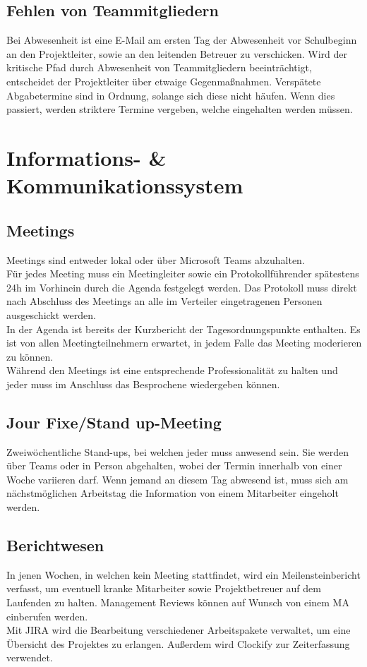 \documentclass[
	headings=optiontotocandhead,%
	oneside,
	numbers=noenddot,%
	toc=flat, %
	10pt, %
	parskip=full, %
	listof=totoc, %
	listof=flat, %
	numbers=noenddot, %
	bibliography=totoc, %
	a4paper,DIV=14,
]{scrartcl}
\begin{document}
\subsection{Fehlen von Teammitgliedern}
Bei Abwesenheit ist eine E-Mail am ersten Tag der Abwesenheit vor Schulbeginn an den Projektleiter, sowie an den leitenden Betreuer zu verschicken. Wird der kritische Pfad durch Abwesenheit von Teammitgliedern beeinträchtigt, entscheidet der Projektleiter über etwaige Gegenmaßnahmen. Verspätete Abgabetermine sind in Ordnung, solange sich diese nicht häufen. Wenn dies passiert, werden striktere Termine vergeben, welche eingehalten werden müssen.

\section{Informations- \& Kommunikationssystem}
\subsection{Meetings}
Meetings sind entweder lokal oder über Microsoft Teams abzuhalten.\\
Für jedes Meeting muss ein Meetingleiter sowie ein Protokollführender spätestens 24h im Vorhinein durch die Agenda festgelegt werden. Das Protokoll muss direkt nach Abschluss des Meetings an alle im Verteiler eingetragenen Personen ausgeschickt werden.\\
In der Agenda ist bereits der Kurzbericht der Tagesordnungspunkte enthalten. Es ist von allen Meetingteilnehmern erwartet, in jedem Falle das Meeting moderieren zu können.\\
Während den Meetings ist eine entsprechende Professionalität zu halten und jeder muss im Anschluss das Besprochene wiedergeben können.

\subsection{Jour Fixe/Stand up-Meeting}
Zweiwöchentliche Stand-ups, bei welchen jeder muss anwesend sein. Sie werden über Teams oder in Person abgehalten, wobei der Termin innerhalb von einer Woche variieren darf. Wenn jemand an diesem Tag abwesend ist, muss sich am nächstmöglichen Arbeitstag die Information von einem Mitarbeiter eingeholt werden.

\subsection{Berichtwesen}
In jenen Wochen, in welchen kein Meeting stattfindet, wird ein Meilensteinbericht verfasst, um eventuell kranke Mitarbeiter sowie Projektbetreuer auf dem Laufenden zu halten. Management Reviews können auf Wunsch von einem MA einberufen werden. \\
Mit JIRA wird die Bearbeitung verschiedener Arbeitspakete verwaltet, um eine Übersicht des Projektes zu erlangen. Außerdem wird Clockify zur Zeiterfassung verwendet.
\end{document}
